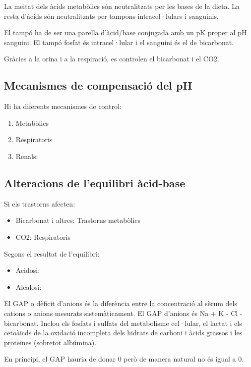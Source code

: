 La meitat dels àcids metabòlics són neutralitzats per les bases de la
dieta. La resta d'àcids són neutralitzats per tampons intracel·lulars
i sanguinis.


El tampó ha de ser una parella d'àcid/base conjugada amb un pK proper
al pH sanguini. El tampó fosfat és intracel·lular i el sanguini és el
de bicarbonat.

Gràcies a la orina i a la respiració, es controlen el bicarbonat i el
CO2.

\subsection{Mecanismes de compensació del pH}
\label{sec:mecan-de-comp}

Hi ha diferents mecanismes de control:
\begin{enumerate}
\item Metabòlics

\item Respiratoris

\item Renals: 
\end{enumerate}

\subsection{Alteracions de l'equilibri àcid-base}
\label{sec:alter-de-lequ}

Si els trastorns afecten:
\begin{itemize}
\item Bicarbonat i altres: Trastorns metabòlics
\item CO2: Respiratoris
\end{itemize}

Segons el resultat de l'equilibri:
\begin{itemize}
\item Acidosi:
\item Alcalosi:
\end{itemize}

El GAP o dèficit d'anions és la diferència entre la concentració al
sèrum dels cations o anions mesurats sistemàticament. El GAP d'anions
és Na + K - Cl - bicarbonat. Inclou els fosfats i sulfats del metabolisme
cel·lular, el lactat i els cetoàicds de la oxidació incompleta dels
hidrats de carboni i àcids grassos i les proteïnes (sobretot
albúmina).

En principi, el GAP hauria de donar 0 però de manera natural no és
igual a 0.

